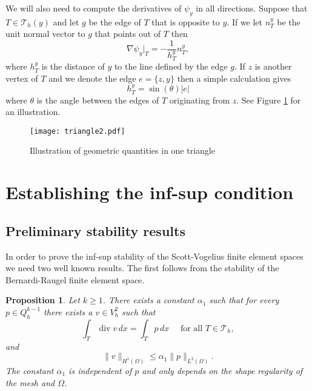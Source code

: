 \documentclass[11pt]{amsart}
\numberwithin{equation}{section}
\newcommand{\ra}[1]{\renewcommand{\arraystretch}{#1}}
\newcommand{\dive}{\operatorname{div}}
\newcommand{\Th}{\mathcal{T}_h}
\newtheorem{proposition}{Proposition}
\theoremstyle{definition}
\begin{document}
We will also need to compute the derivatives of $\psi_y$  in all directions. Suppose that $T \in \Th(y)$ and let $g$ be the edge of $T$ that is opposite to $y$. If we let $n_T^y$ 
be the unit normal vector to $g$ that points out of $T$ then
\begin{equation}\label{nablapsi}
\nabla \psi_y|_T = - \frac{1}{h_T^y} n_T^y,   
\end{equation}
where $h_T^y$  is the distance of $y$ to the line defined by the edge $g$. If 
$z$ is another vertex of $T$ and  we denote the edge $e=\{ z, y\}$  then  a simple calculation gives
\begin{equation}\label{hTj}
h_T^y= \sin(\theta) |e|
\end{equation}
where $\theta$ is the angle between the edges of $T$ originating from $z$. See Figure \ref{triangle2} for an illustration. 


\begin{figure}
\vspace{-30pt}
\centerline{\texttt{[image: triangle2.pdf]}}
\footnotesize
\ra{1.1}
\vspace{-90pt}
\caption{Illustration of geometric quantities in one triangle}
\label{triangle2}
\end{figure}



\section{Establishing the inf-sup condition}\label{proof}

\subsection{Preliminary stability results}

In order to prove the inf-sup stability of the Scott-Vogelius finite element spaces  we need two well known results. The first follows from the stability of the Bernardi-Raugel \cite{bernardi1985analysis} finite element space.
\begin{proposition}\label{prop1}
Let $k \ge 1$. There exists a constant $\alpha_1$ such that for every $p \in Q_h^{k-1}$  there exists a $v \in V_h^2$ such that 
\begin{equation*}
\int_{T} \dive v \, dx =\int_T p \, dx \quad \text{ for all } T \in \Th,
\end{equation*}  
and 
\begin{equation*}
\|v\|_{H^1(\Omega)} \le \alpha_1  \|p\|_{L^2(\Omega)}. 
\end{equation*}
The constant $\alpha_1$ is independent of $p$ and only depends on the shape regularity of the mesh and $\Omega$.
\end{proposition}
\end{document}
